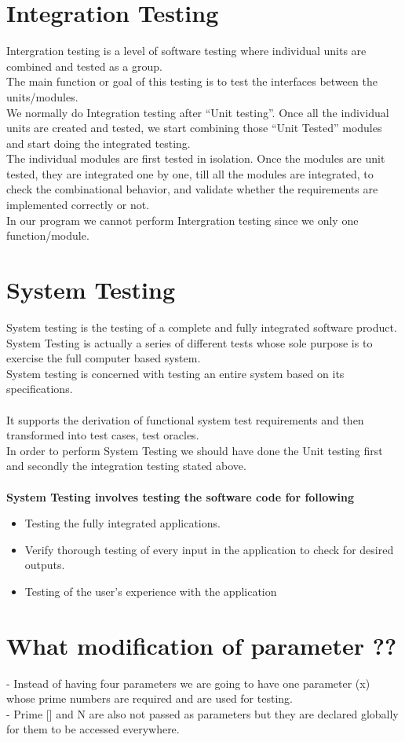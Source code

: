 \documentclass[12pt]{article}
\begin{document}
\section{Integration Testing} 
Intergration testing is a level of software testing where individual units are combined and tested as a
group.\\
The main function or goal of this testing is to test the interfaces between the units/modules.\\
We normally do Integration testing after “Unit testing”. Once all the individual units are created and
tested, we start combining those “Unit Tested” modules and start doing the integrated testing.\\
The individual modules are first tested in isolation. Once the modules are unit tested, they are integrated
one by one, till all the modules are integrated, to check the combinational behavior, and validate whether
the requirements are implemented correctly or not.\\
In our program we cannot perform Intergration testing since we only one function/module.

\section {System Testing} 
System testing is the testing of a complete and fully integrated software product.
System Testing is actually a series of different tests whose sole purpose is to exercise the full computer
based system.\\
System testing is concerned with testing an entire system based on its specifications.\\
\\
It supports the derivation of functional system test requirements and then transformed into test cases, test
oracles.\\
In order to perform System Testing we should have done the Unit testing first and secondly the
integration testing stated above.\\
\\
\textbf{System Testing involves testing the software code for following}
\begin{itemize}
  \item Testing the fully integrated applications.
  \item Verify thorough testing of every input in the application to check for desired outputs.
  \item Testing of the user's experience with the application
\end{itemize}

\section{What modification of parameter ??}
- Instead of having four parameters we are going to have one parameter (x) whose prime numbers are
required and are used for testing.\\
- Prime [] and N are also not passed as parameters but they are declared globally for them to be accessed everywhere.
\end{document}
